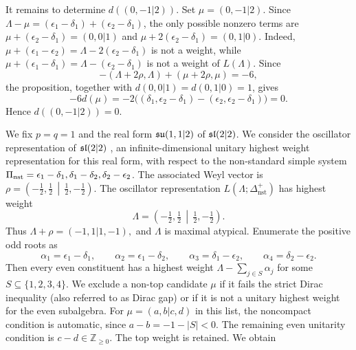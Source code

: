 \begin{example}
It remains to determine $d((0,-1\vert2))$. Set $\mu=(0,-1\vert2)$. Since $\Lambda-\mu=(\epsilon_1-\delta_1)+(\epsilon_2-\delta_1)$, the only possible nonzero terms are $\mu+(\epsilon_2-\delta_1)=(0,0\vert1)$ and $\mu+2(\epsilon_2-\delta_1)=(0,1\vert0)$. Indeed, $\mu+(\epsilon_1-\epsilon_2)=\Lambda-2(\epsilon_2-\delta_1)$ is not a weight, while $\mu+(\epsilon_1-\delta_1)=\Lambda-(\epsilon_2-\delta_1)$ is not a weight of $L(\Lambda)$. Since
\[
-(\Lambda+2\rho,\Lambda)+(\mu+2\rho,\mu)=-6,
\]
the proposition, together with $d(0,0\vert1)=d(0,1\vert0)=1$, gives
\[
-6d(\mu)
=-2\bigl((\delta_1,\epsilon_2-\delta_1)-(\epsilon_2,\epsilon_2-\delta_1)\bigr)=0.
\]
Hence $d((0,-1\vert2))=0$.
\end{example}

\begin{example}\label{ex::oscillator_representation_dimensions}
We fix $p=q=1$ and the real form $\su(1,1\vert2)$ of $\sl(2\vert2)$. We consider the oscillator representation of $\sl(2\vert2)$ \cite{furutsu1991classification}, an infinite-dimensional unitary highest weight representation for this real form, with respect to the non-standard simple system $\Pi_{\nst}={\epsilon_1-\delta_1,\delta_1-\delta_2,\delta_2-\epsilon_2}$. The associated Weyl vector is
$
\rho
=
\left(
-\tfrac12,\tfrac12
\,\middle\vert\,
\tfrac12,-\tfrac12
\right).$
The oscillator representation
$L(\Lambda;\Delta_{\mathrm{nst}}^{+})$
has highest weight
\[
\Lambda
=
\left(
-\tfrac12,\tfrac12
\,\middle\vert\,
\tfrac12,-\tfrac12
\right).
\]
Thus
$
\Lambda+\rho=(-1,1\vert1,-1),
$ and $\Lambda$ is maximal atypical. Enumerate the positive odd roots as
\[
\alpha_1=\epsilon_1-\delta_1,\qquad
\alpha_2=\epsilon_1-\delta_2,\qquad
\alpha_3=\delta_1-\epsilon_2,\qquad
\alpha_4=\delta_2-\epsilon_2.
\]
Then every even constituent has a
highest weight $\Lambda-\sum_{j\in S}\alpha_j$ for some
$S\subseteq\{1,2,3,4\}$. We exclude a non-top candidate $\mu$ if it fails the strict Dirac
inequality (also referred to as Dirac gap) or if it is not a unitary highest weight for the even subalgebra.
For $\mu=(a,b\vert c,d)$ in this list, the noncompact condition is
automatic, since $a-b=-1-|S|<0$. The remaining even unitarity condition
is $c-d\in\mathbb Z_{\geq0}$.
The top weight is retained. We obtain 


\end{example}
